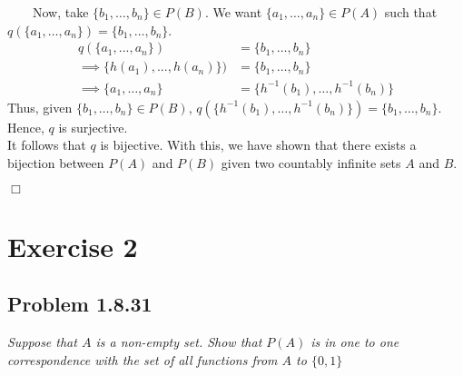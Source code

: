 \documentclass[
]{article}
\begin{document}
~~~~Now, take \(\{b_1, \dots, b_n \} \in P(B)\). We want
\(\{a_1, \dots, a_n \}\in P(A)\) such that
\(q(\{a_1, \dots, a_n \}) = \{b_1, \dots, b_n \}\).\\
\[ \begin{aligned} q(\{a_1, ..., a_n\}) &= \{b_1, \dots, b_n \} \\
\implies \{h(a_1), ..., h(a_n)\}) &= \{b_1, \dots, b_n \} \\ \implies \{a_1, \dots, a_n \} &= \{h^{-1}(b_1), \dots, h^{-1}(b_n) \} \end{aligned} \]
Thus, given \(\{b_1, \dots, b_n \} \in P(B)\),
\(q(\{h^{-1}(b_1), \dots, h^{-1}(b_n) \}) = \{b_1, \dots, b_n \}\).
Hence, \(q\) is surjective.\\
\hspace*{0.333em}\hspace*{0.333em}\hspace*{0.333em}\hspace*{0.333em}It
follows that \(q\) is bijective. With this, we have shown that there
exists a bijection between \(P(A)\) and \(P(B)\) given two countably
infinite sets \(A\) and \(B\).

\hfill \(\Box\)

\hypertarget{exercise-2}{%
\section{Exercise 2}\label{exercise-2}}

\hypertarget{problem-1.8.31}{%
\subsection{Problem 1.8.31}\label{problem-1.8.31}}

\emph{Suppose that \(A\) is a non-empty set. Show that \(P(A)\) is in
one to one correspondence with the set of all functions from \(A\) to
\(\{0, 1\}\)}
\end{document}
